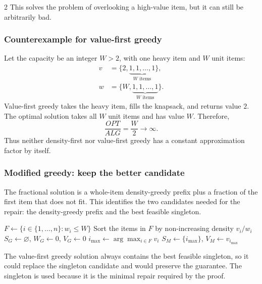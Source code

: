 \documentclass[8pt]{extarticle}
\theoremstyle{definition}
\begin{document}
\begin{multicols*}{2}
This solves the problem of overlooking a high-value item, but it can still be arbitrarily bad.
\subsubsection*{Counterexample for value-first greedy}
Let the capacity be an integer $W>2$, with one heavy item and $W$ unit items:
\begin{align*}
  v &= \{2, \underbrace{1,1,\ldots,1}_{W\text{ items}}\},\\
  w &= \{W, \underbrace{1,1,\ldots,1}_{W\text{ items}}\}.
\end{align*}
Value-first greedy takes the heavy item, fills the knapsack, and returns value $2$. The optimal solution takes all $W$ unit items and has value $W$. Therefore,
\[
  \frac{OPT}{ALG}=\frac{W}{2}\longrightarrow\infty.
\]
Thus neither density-first nor value-first greedy has a constant approximation factor by itself.

\subsubsection*{Modified greedy: keep the better candidate}
The fractional solution is a whole-item density-greedy prefix plus a fraction of the first item that does not fit. This identifies the two candidates needed for the repair: the density-greedy prefix and the best feasible singleton.


\begin{algorithm}[H]
  \caption{Modified two-candidate greedy for 0/1 knapsack}
  $F \gets \{i \in \{1,\ldots,n\}:w_i\leq W\}$\;
  Sort the items in $F$ by non-increasing density $v_i/w_i$\;
  $S_G \gets \varnothing$, $W_G \gets 0$, $V_G \gets 0$\;
  $i_{\max}\gets\arg\max_{i\in F}v_i$\;
  $S_M\gets\{i_{\max}\}$, $V_M\gets v_{i_{\max}}$\;
\end{algorithm}

The value-first greedy solution always contains the best feasible singleton, so it could replace the singleton candidate and would preserve the guarantee. The singleton is used because it is the minimal repair required by the proof.




\end{multicols*}
\end{document}
